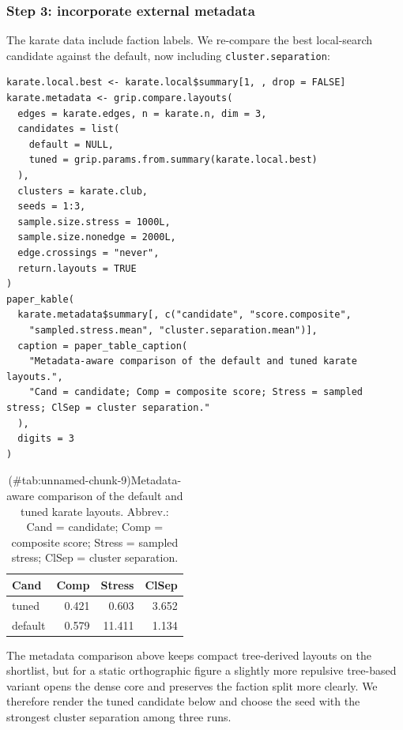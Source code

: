 \subsubsection{Step 3: incorporate external metadata}\label{step-3-incorporate-external-metadata}

The karate data include faction labels. We re-compare the best local-search
candidate against the default, now including \texttt{cluster.separation}:

\begin{verbatim}
karate.local.best <- karate.local$summary[1, , drop = FALSE]
karate.metadata <- grip.compare.layouts(
  edges = karate.edges, n = karate.n, dim = 3,
  candidates = list(
    default = NULL,
    tuned = grip.params.from.summary(karate.local.best)
  ),
  clusters = karate.club,
  seeds = 1:3,
  sample.size.stress = 1000L,
  sample.size.nonedge = 2000L,
  edge.crossings = "never",
  return.layouts = TRUE
)
paper_kable(
  karate.metadata$summary[, c("candidate", "score.composite",
    "sampled.stress.mean", "cluster.separation.mean")],
  caption = paper_table_caption(
    "Metadata-aware comparison of the default and tuned karate layouts.",
    "Cand = candidate; Comp = composite score; Stress = sampled stress; ClSep = cluster separation."
  ),
  digits = 3
)
\end{verbatim}

\begin{table}

\caption{(\#tab:unnamed-chunk-9)Metadata-aware comparison of the default and tuned karate layouts. Abbrev.: Cand = candidate; Comp = composite score; Stress = sampled stress; ClSep = cluster separation.}
\centering
\begin{tabular}[t]{l|r|r|r}
\hline
Cand & Comp & Stress & ClSep\\
\hline
tuned & 0.421 & 0.603 & 3.652\\
\hline
default & 0.579 & 11.411 & 1.134\\
\hline
\end{tabular}
\end{table}

The metadata comparison above keeps compact tree-derived layouts on the
shortlist, but for a static orthographic figure a slightly more repulsive
tree-based variant opens the dense core and preserves the faction split more
clearly. We therefore render the tuned candidate below and choose the seed
with the strongest cluster separation among three runs.

